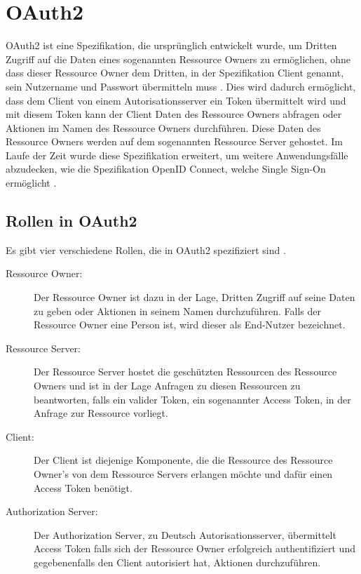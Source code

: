 %
%
\section{OAuth2}
\label{sec:OAuth2}
OAuth2 ist eine Spezifikation, die ursprünglich entwickelt wurde, um Dritten Zugriff auf die Daten eines sogenannten Ressource Owners zu ermöglichen, ohne dass dieser Ressource Owner dem Dritten, in der Spezifikation Client genannt, sein Nutzername und Passwort übermitteln muss \citep{oauth2:2012}. Dies wird dadurch ermöglicht, dass dem Client von einem Autorisationsserver ein Token übermittelt wird und mit diesem Token kann der Client Daten des Ressource Owners abfragen oder Aktionen im Namen des Ressource Owners durchführen. Diese Daten des Ressource Owners werden auf dem sogenannten Ressource Server gehostet.
Im Laufe der Zeit wurde diese Spezifikation erweitert, um weitere Anwendungsfälle abzudecken, wie die Spezifikation OpenID Connect, welche Single Sign-On ermöglicht \citep{openidconnect:2014}. 

\subsection{Rollen in OAuth2}
\label{subsec:OAuth2:RolleninOAuth2}
Es gibt vier verschiedene Rollen, die in OAuth2 spezifiziert sind \citep{oauth2:2012}.

\begin{description}
  \item[Ressource Owner:] Der Ressource Owner ist dazu in der Lage, Dritten Zugriff auf seine Daten zu geben oder Aktionen in seinem Namen durchzuführen. Falls der Ressource Owner eine Person ist, wird dieser als End-Nutzer bezeichnet.
  \item[Ressource Server:] Der Ressource Server hostet die geschützten Ressourcen des Ressource Owners und ist in der Lage Anfragen zu diesen Ressourcen zu beantworten, falls ein valider Token, ein sogenannter Access Token, in der Anfrage zur Ressource vorliegt.
  \item[Client:] Der Client ist diejenige Komponente, die die Ressource des Ressource Owner's von dem Ressource Servers erlangen möchte und dafür einen Access Token benötigt. 
  \item[Authorization Server:] Der Authorization Server, zu Deutsch Autorisationsserver, übermittelt Access Token falls sich der Ressource Owner erfolgreich authentifiziert und gegebenenfalls den Client autorisiert hat, Aktionen durchzuführen. 
\end{description}


